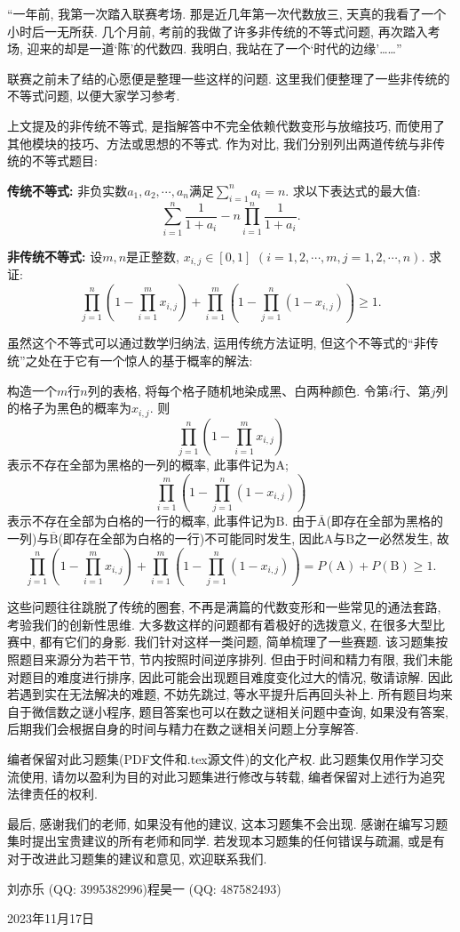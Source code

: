 \documentclass[lang=cn,12pt,thmcnt=section]{elegantbook}
\begin{document}
{\kaishu “一年前, 我第一次踏入联赛考场. 那是近几年第一次代数放三, 天真的我看了一个小时后一无所获. 几个月前, 考前的我做了许多非传统的不等式问题, 再次踏入考场, 迎来的却是一道‘陈’的代数四. 我明白, 我站在了一个‘时代的边缘’……”}\par
联赛之前未了结的心愿便是整理一些这样的问题. 这里我们便整理了一些非传统的不等式问题, 以便大家学习参考.\par
上文提及的非传统不等式, 是指解答中不完全依赖代数变形与放缩技巧, 而使用了其他模块的技巧、方法或思想的不等式. 作为对比, 我们分别列出两道传统与非传统的不等式题目:\par
\textbf{传统不等式: }{\kaishu 非负实数$a_1,a_2,\cdots,a_n$满足$\sum_{i=1}^{n}a_i=n$. 求以下表达式的最大值:
\[\sum_{i=1}^n\frac{1}{1+a_i}-n\prod_{i=1}^n\frac{1}{1+a_i}.\]
}\par
\textbf{非传统不等式: }{\kaishu 设$m, n$是正整数, $x_{i,j}\in[0,1]$ $(i=1,2,\cdots,m,j=1,2,
\cdots,n)$. 求证:
\[\prod_{j=1}^n\left(1-\prod_{i=1}^m x_{i,j}\right)+\prod_{i=1}^m\left(1-\prod_{j=1}^n (1-x_{i,j})\right)\ge 1.\]}\par
虽然这个不等式可以通过数学归纳法, 运用传统方法证明, 但这个不等式的“非传统”之处在于它有一个惊人的基于概率的解法:\par
{\kaishu 构造一个$m$行$n$列的表格, 将每个格子随机地染成黑、白两种颜色. 令第$i$行、第$j$列的格子为黑色的概率为$x_{i,j}$. 则
\[\prod_{j=1}^n\left(1-\prod_{i=1}^m x_{i,j}\right)\]
表示不存在全部为黑格的一列的概率, 此事件记为$\mathrm{A}$;
\[\prod_{i=1}^m\left(1-\prod_{j=1}^n (1-x_{i,j})\right)\]
表示不存在全部为白格的一行的概率, 此事件记为$\mathrm{B}$. 由于$\overline{\mathrm{A}}$(即存在全部为黑格的一列)与$\overline{\mathrm{B}}$(即存在全部为白格的一行)不可能同时发生, 因此$\mathrm{A}$与$\mathrm{B}$之一必然发生, 故
\[\prod_{j=1}^n\left(1-\prod_{i=1}^m x_{i,j}\right)+\prod_{i=1}^m\left(1-\prod_{j=1}^n (1-x_{i,j})\right)=P(\mathrm{A})+P(\mathrm{B})\ge 1.\]}\par
这些问题往往跳脱了传统的圈套, 不再是满篇的代数变形和一些常见的通法套路, 考验我们的创新性思维. 大多数这样的问题都有着极好的选拨意义, 在很多大型比赛中, 都有它们的身影. 我们针对这样一类问题, 简单梳理了一些赛题. 该习题集按照题目来源分为若干节, 节内按照时间逆序排列. 但由于时间和精力有限, 我们未能对题目的难度进行排序, 因此可能会出现题目难度变化过大的情况, 敬请谅解. 因此若遇到实在无法解决的难题, 不妨先跳过, 等水平提升后再回头补上. 所有题目均来自于微信数之谜小程序, 题目答案也可以在数之谜相关问题中查询, 如果没有答案, 后期我们会根据自身的时间与精力在数之谜相关问题上分享解答.\par
编者保留对此习题集(PDF文件和.tex源文件)的文化产权. 此习题集仅用作学习交流使用, 请勿以盈利为目的对此习题集进行修改与转载, 编者保留对上述行为追究法律责任的权利.\par
最后, 感谢我们的老师, 如果没有他的建议, 这本习题集不会出现. 感谢在编写习题集时提出宝贵建议的所有老师和同学. 若发现本习题集的任何错误与疏漏, 或是有对于改进此习题集的建议和意见, 欢迎联系我们.\par
\quad\par
{\hfill\kaishu 刘亦乐 (QQ: 3995382996)\quad 程昊一 (QQ: 487582493)}\par
{\hfill\kaishu 2023年11月17日}
\end{document}
